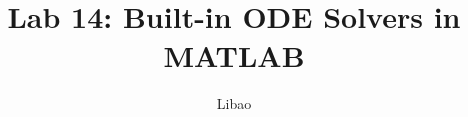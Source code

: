 \newcommand{\course}{MATH 3341}
\title{Lab 14: Built-in ODE Solvers in MATLAB}
\author{Libao}
\date{}
